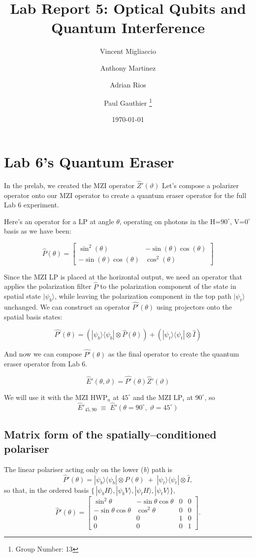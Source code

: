 \documentclass{article}
\title{Lab Report 5: Optical Qubits and Quantum Interference}
\author{
  Vincent Migliaccio \and
  Anthony Martinez \and
  Adrian Rios \and
  Paul Gauthier
  \thanks{Group Number: 13} \\
}
\date{\today}
\begin{document}


\section*{Lab 6's Quantum Eraser}

In the prelab, we created the MZI operator $\hat{Z}'(\vartheta)$
Let's compose a polarizer operator onto our MZI operator
to create a quantum eraser operator for the full Lab 6 experiment.

Here's an operator for a LP at angle $\theta$,
operating on photons in the H=$90^\circ$, V=$0^\circ$ basis as we have been:

$$\hat{P}(\theta) = \left[\begin{matrix}\sin^{2}{\left(\theta \right)} & - \sin{\left(\theta \right)} \cos{\left(\theta \right)}\\- \sin{\left(\theta \right)} \cos{\left(\theta \right)} & \cos^{2}{\left(\theta \right)}\end{matrix}\right]$$


Since the MZI LP is placed at the horizontal output, 
we need an operator that applies the polarization filter $\hat{P}$
to the polarization component of the state in spatial state $|\psi_b\rangle$,
while leaving the polarization component in the top path $|\psi_t\rangle$ unchanged.
We can construct an operator $\hat{P'}(\theta)$
using projectors onto the spatial basis states:

$$  \hat{P'}(\theta) = (|\psi_b\rangle\langle\psi_b| \otimes \hat{P}(\theta)) + (|\psi_t\rangle\langle\psi_t| \otimes \hat{I}) $$

And now we can compose $\hat{P'}(\theta)$ as the final operator to create
the quantum eraser operator from Lab 6.

$$\hat{E}'(\theta,\vartheta) = \hat{P'}(\theta) \hat{Z}'(\vartheta)$$

We will use it with the MZI HWP$_u$ at $45^\circ$ and the
MZI LP$_i$ at $90^\circ$, so
$$
\hat{E}'_{45,90}\;\equiv\;
\hat{E}'\!\left(\theta=90^\circ,\;\vartheta=45^\circ\right)
$$

\subsection*{Matrix form of the spatially--conditioned polariser}

The linear polariser acting only on the lower (\emph{b}) path is
\[
\hat{P}'(\theta)=
|\psi_b\rangle\langle\psi_b|\otimes \hat{P}(\theta)
\;+\;
|\psi_t\rangle\langle\psi_t|\otimes \hat{I},
\]
so that, in the ordered basis
\(
\{\,|\psi_bH\rangle,|\psi_bV\rangle,
     |\psi_tH\rangle,|\psi_tV\rangle\},
\)
\[
\hat{P}'(\theta)=
\begin{bmatrix}
\sin^{2}\theta & -\sin\theta\cos\theta & 0 & 0\\
-\sin\theta\cos\theta & \cos^{2}\theta & 0 & 0\\
0 & 0 & 1 & 0\\
0 & 0 & 0 & 1
\end{bmatrix}.
\]
\end{document}
